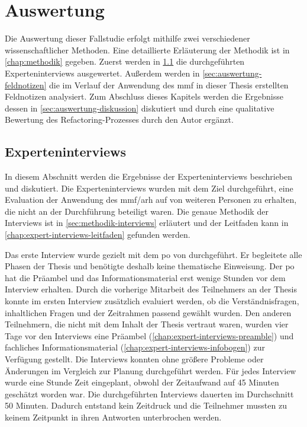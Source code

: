 \chapter{Auswertung}
\label{chap:auswertung}

Die Auswertung dieser Fallstudie erfolgt mithilfe zwei verschiedener wissenschaftlicher Methoden.
Eine detaillierte Erläuterung der Methodik ist in \cref{chap:methodik} gegeben.
Zuerst werden in \cref{sec:auswertung-interviews} die durchgeführten Experteninterviews ausgewertet.
Außerdem werden in \cref{sec:auswertung-feldnotizen} die im Ver\-lauf der Anwendung des \gls{mmf} in dieser Thesis erstellten Feldnotizen analysiert.
Zum Abschluss dieses Kapitels werden die Ergebnisse dessen in \cref{sec:auswertung-diskussion} diskutiert und durch eine qualitative Bewertung des Refactoring-Prozesses durch den Autor ergänzt.

\section{Experteninterviews}
\label{sec:auswertung-interviews}

In diesem Abschnitt werden die Ergebnisse der Experteninterviews beschrieben und diskutiert.
Die Ex\-per\-ten\-inter\-views wurden mit dem Ziel durchgeführt, eine Evaluation der Anwendung des \gls{mmf}/\gls{arh} auf \jf von weiteren Personen zu erhalten, die nicht an der Durchführung beteiligt waren.
Die genaue Methodik der Interviews ist in \cref{sec:methodik-interviews} erläutert und der Leitfaden kann in \cref{chap:expert-interviews-leitfaden} gefunden werden.

Das erste Interview wurde gezielt mit dem \gls{po} von \jf durchgeführt.
Er begleitete alle Phasen der Thesis und benötigte deshalb keine thematische Einweisung.
Der \gls{po} hat die Präambel und das Informationsmaterial erst wenige Stunden vor dem Interview erhalten.
Durch die vorherige Mitarbeit des Teilnehmers an der Thesis konnte im ersten Interview zusätzlich evaluiert werden, ob die Verständnisfragen, inhaltlichen Fragen und der Zeitrahmen passend gewählt wurden.
Den anderen Teilnehmern, die nicht mit dem Inhalt der Thesis vertraut waren, wurden vier Tage vor den Interviews eine Präambel (\cref{chap:expert-interviews-preamble}) und fachliches Informationsmaterial (\cref{chap:expert-interviews-infobogen}) zur Verfügung gestellt.
Die Interviews konnten ohne größere Probleme oder Änderungen im Vergleich zur Planung durchgeführt werden.
Für jedes Interview wurde eine Stunde Zeit eingeplant, obwohl der Zeitaufwand auf 45 Minuten geschätzt worden war.
Die durchgeführten Interviews dauerten im Durchschnitt 50 Minuten.
Dadurch entstand kein Zeitdruck und die Teilnehmer mussten zu keinem Zeitpunkt in ihren Antworten unterbrochen werden.

